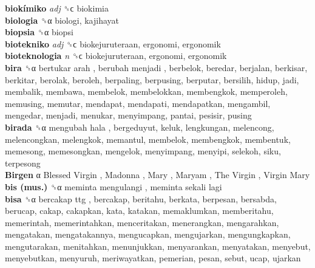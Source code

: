 \textbf{biokímiko} \emph{adj}  ␝ϲ  biokimia  \\
\textbf{biologia} ␝α  biologi, kajihayat  \\
\textbf{biopsia} ␝α  biopsi  \\
\textbf{biotekniko} \emph{adj}  ␝ϲ  biokejuruteraan, ergonomi, ergonomik  \\
\textbf{bioteknologia} \emph{n}  ␝ϲ  biokejuruteraan, ergonomi, ergonomik  \\
\textbf{bira} ␝α   bertukar arah ,  berubah menjadi , berbelok, beredar, berjalan, berkisar, berkitar, berolak, beroleh, berpaling, berpusing, berputar, bersilih, hidup, jadi, membalik, membawa, membelok, membelokkan, membengkok, memperoleh, memusing, memutar, mendapat, mendapati, mendapatkan, mengambil, mengedar, menjadi, menukar, menyimpang, pantai, pesisir, pusing  \\
\textbf{birada} ␝α   mengubah hala , bergeduyut, keluk, lengkungan, melencong, melencongkan, melengkok, memantul, membelok, membengkok, membentuk, memesong, memesongkan, mengelok, menyimpang, menyipi, selekoh, siku, terpesong  \\
\textbf{Birgen} α   Blessed Virgin ,  Madonna ,  Mary ,  Maryam ,  The Virgin ,  Virgin Mary   \\
\textbf{bis (mus.)} ␝α   meminta mengulangi ,  meminta sekali lagi   \\
\textbf{bisa} ␝α   bercakap ttg , bercakap, beritahu, berkata, berpesan, bersabda, berucap, cakap, cakapkan, kata, katakan, memaklumkan, memberitahu, memerintah, memerintahkan, menceritakan, menerangkan, mengarahkan, mengatakan, mengatakannya, mengucapkan, mengujarkan, mengungkapkan, mengutarakan, menitahkan, menunjukkan, menyarankan, menyatakan, menyebut, menyebutkan, menyuruh, meriwayatkan, pemerian, pesan, sebut, ucap, ujarkan  \\
